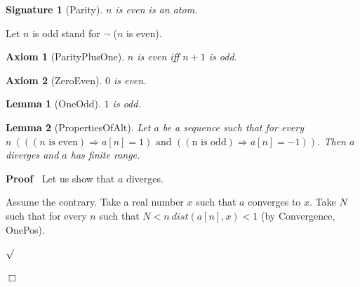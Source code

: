\documentclass{article}
\newenvironment{forthel}{\begin{leftbar}}{\end{leftbar}}
\newenvironment{proof}{\noindent\textbf{Proof\ }}{\hspace*{\fill}$\Box$\medskip}
\newenvironment{subproof}{\begin{list}{}{}
		\item[\text{Proof}]}{\hfill $\surd$ \end{list}}
\newtheorem{axiom}{Axiom}
\newtheorem{lemma}{Lemma}
\newtheorem{signature}{Signature}
\begin{document}
\begin{forthel}
	\begin{signature}[Parity]
	$n$ is even is an atom.
	\end{signature}
	
	\noindent Let $n$ is odd stand for $\neg$ ($n$ is even).
	
	\begin{axiom}[ParityPlusOne]
	$n$ is even iff $n + 1$ is odd.
	\end{axiom}

	\begin{axiom}[ZeroEven]
	$0$ is even.
	\end{axiom}
	
	\begin{lemma}[OneOdd]
	$1$ is odd.
	\end{lemma} 
	
	\begin{lemma}[PropertiesOfAlt]
		Let $a$ be a sequence such that for every $n \ (((n \text{ is even}) \Rightarrow a[n] = 1) \text{ and } ((\text{n is odd}) \Rightarrow a[n] = -1))$.
		Then $a$ diverges and $a$ has finite range.
	\end{lemma}
	\begin{proof}
		Let us show that $a$ diverges.
		\begin{subproof}
			Assume the contrary.
			Take a real number $x$ such that $a$ converges to $x$.
			Take $N$ such that for every $n$ such that $N < n \ dist(a[n],x) < 1$ (by Convergence, OnePos).
			

\end{subproof}
\end{proof}
\end{forthel}
\end{document}
